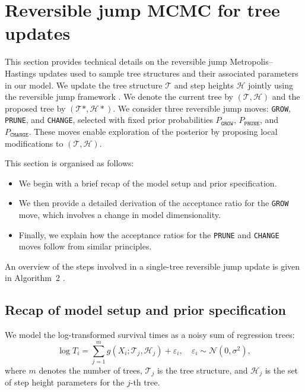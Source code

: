 \section{Reversible jump MCMC for tree updates}\label{appendix:comp_details}

This section provides technical details on the reversible jump Metropolis--Hastings updates used to sample tree structures and their associated parameters in our model.
We update the tree structure $\mathcal{T}$ and step heights $\mathcal{H}$ jointly using the reversible jump framework \citep{ReversibleJump}.
We denote the current tree by $(\mathcal{T}, \mathcal{H})$ and the proposed tree by $(\mathcal{T}*, \mathcal{H}*)$.
We consider three reversible jump moves: \texttt{GROW}, \texttt{PRUNE}, and \texttt{CHANGE}, selected with fixed prior probabilities $P_\texttt{GROW}$, $P_\texttt{PRUNE}$, and $P_\texttt{CHANGE}$.
These moves enable exploration of the posterior by proposing local modifications to $(\mathcal{T}, \mathcal{H})$.

This section is organised as follows:
\begin{itemize}
    \item We begin with a brief recap of the model setup and prior specification.
    \item We then provide a detailed derivation of the acceptance ratio for the \texttt{GROW} move, which involves a change in model dimensionality.
    \item Finally, we explain how the acceptance ratios for the \texttt{PRUNE} and \texttt{CHANGE} moves follow from similar principles.
\end{itemize}

An overview of the steps involved in a single-tree reversible jump update is given in Algorithm~2 \citep{main_article}. 

\subsection{Recap of model setup and prior specification}

We model the log-transformed survival times as a noisy sum of regression trees:
\begin{equation}\label{model_appendix}
\log T_i = \sum_{j=1}^m g(X_i; \mathcal{T}_j, \mathcal{H}_j) + \varepsilon_i, \quad \varepsilon_i \sim \mathcal{N}(0, \sigma^2),
\end{equation}
where $m$ denotes the number of trees, $\mathcal{T}_j$ is the tree structure, and $\mathcal{H}_j$ is the set of step height parameters for the $j$-th tree.

